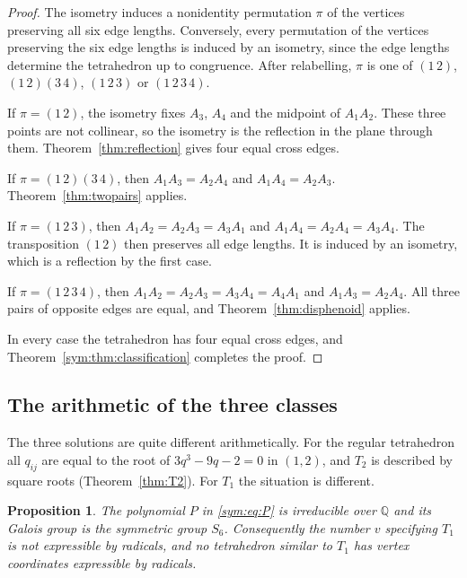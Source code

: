 \documentclass[11pt]{article}
\newtheorem{proposition}[theorem]{Proposition}
\theoremstyle{definition}
\theoremstyle{remark}
\begin{document}
\begin{proof}
The isometry induces a nonidentity permutation $\pi$ of the vertices preserving all six edge lengths. Conversely, every permutation of the vertices preserving the six edge lengths is induced by an isometry, since the edge lengths determine the tetrahedron up to congruence. After relabelling, $\pi$ is one of $(1\,2)$, $(1\,2)(3\,4)$, $(1\,2\,3)$ or $(1\,2\,3\,4)$.

If $\pi=(1\,2)$, the isometry fixes $A_3$, $A_4$ and the midpoint of $A_1A_2$. These three points are not collinear, so the isometry is the reflection in the plane through them. Theorem~\ref{thm:reflection} gives four equal cross edges.

If $\pi=(1\,2)(3\,4)$, then $A_1A_3=A_2A_4$ and $A_1A_4=A_2A_3$. Theorem~\ref{thm:twopairs} applies.

If $\pi=(1\,2\,3)$, then $A_1A_2=A_2A_3=A_3A_1$ and $A_1A_4=A_2A_4=A_3A_4$. The transposition $(1\,2)$ then preserves all edge lengths. It is induced by an isometry, which is a reflection by the first case.

If $\pi=(1\,2\,3\,4)$, then $A_1A_2=A_2A_3=A_3A_4=A_4A_1$ and $A_1A_3=A_2A_4$. All three pairs of opposite edges are equal, and Theorem~\ref{thm:disphenoid} applies.

In every case the tetrahedron has four equal cross edges, and Theorem~\ref{sym:thm:classification} completes the proof.
\end{proof}

\subsection{The arithmetic of the three classes}

The three solutions are quite different arithmetically. For the regular tetrahedron all $q_{ij}$ are equal to the root of $3q^3-9q-2=0$ in $(1,2)$, and $T_2$ is described by square roots (Theorem~\ref{thm:T2}). For $T_1$ the situation is different.

\begin{proposition}\label{prop:T1galois}
The polynomial $P$ in \eqref{sym:eq:P} is irreducible over $\mathbb Q$ and its Galois group is the symmetric group $S_6$. Consequently the number $v$ specifying $T_1$ is not expressible by radicals, and no tetrahedron similar to $T_1$ has vertex coordinates expressible by radicals.
\end{proposition}
\end{document}
